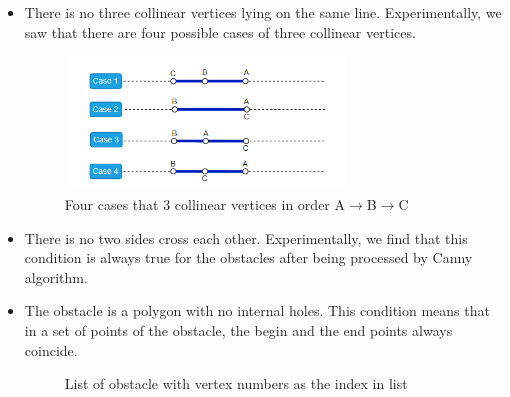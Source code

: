 \documentclass[13pt,a4paper]{article}
\begin{document}
			\begin{itemize}
				\item There is no three collinear vertices lying on the same line. Experimentally, we saw that there are four possible cases of three collinear vertices.
				\begin{figure}[!h]
					\centering
					\includegraphics[width=0.7\textwidth]{Robot_Global_Vision_Update/RGVU_4case_thanghang.png}
					\caption{Four cases that 3 collinear vertices in order A$\rightarrow$B$\rightarrow$C}
				\end{figure}
				
				\item There is no two sides cross each other. Experimentally, we find that this condition is always true for the obstacles after being processed by Canny algorithm.
				\item The obstacle is a polygon with no internal holes. This condition means that in a set of points of the obstacle, the begin and the end points always coincide.\\
				\begin{figure}
					\centering
					\qquad
					\caption{List of obstacle with vertex numbers as the index in list}
					\label{fig:my_label}
				\end{figure}
			\end{itemize}
			
\end{document}
